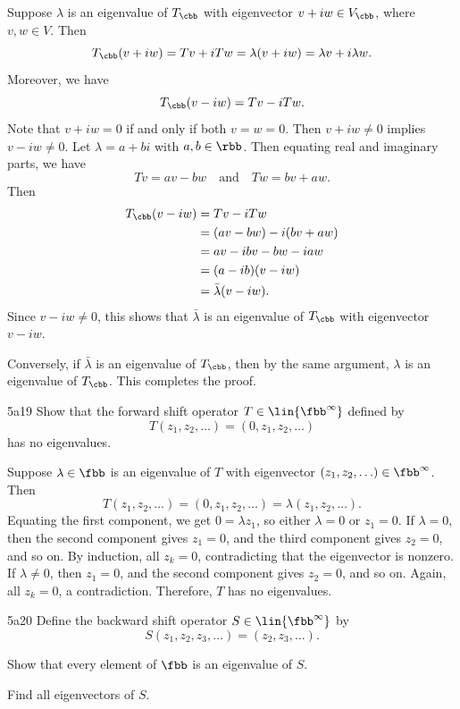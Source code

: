 \begin{sol}
    Suppose $\lambda$ is an eigenvalue of $T_\cbb$ with eigenvector $v + iw \in V_\cbb$, where $v, w \in V$.
	Then
    \[
    	T_\cbb(v + iw) = Tv + iTw = \lambda (v + iw) = \lambda v + i\lambda w.
    \]
    Moreover, we have
    \[
    	T_\cbb(v - iw) = Tv - iTw.
    \]
    Note that $v + iw = 0$ if and only if both $v = w = 0$.
	Then $v + iw \neq 0$ implies $v -i w \neq 0$.
	Let $\lambda = a + bi$ with $a, b \in \rbb$.
	Then equating real and imaginary parts, we have
    \[
    	Tv = av - bw \quad \text{and} \quad Tw = bv + aw.
    \]
    Then
    \begin{align*}
        T_\cbb(v - iw) &= Tv - iTw \\
        &= (av - bw) - i(bv + aw) \\
        &= av - ibv - bw - iaw \\
        &= (a - ib)(v - iw) \\
        &= \bar{\lambda} (v - iw).
    \end{align*}
    Since $v - iw \neq 0$, this shows that $\bar{\lambda}$ is an eigenvalue of $T_\cbb$ with eigenvector $v - iw$.

    Conversely, if $\bar{\lambda}$ is an eigenvalue of $T_\cbb$, then by the same argument, $\lambda$ is an eigenvalue of $T_\cbb$.
	This completes the proof.
\end{sol}

\begin{exercise}{5a19}
    Show that the forward shift operator $T \in \lin{\fbb^\infty}$ defined by
    \[
    	T(z_1, z_2, \ldots) = (0, z_1, z_2, \ldots)
    \]
    has no eigenvalues.
\end{exercise}

\begin{sol}
    Suppose $\lambda \in \fbb$ is an eigenvalue of $T$ with eigenvector $(z_1, z_2, \ldots) \in \fbb^\infty$.
	Then
    \[
    	T(z_1, z_2, \ldots) = (0, z_1, z_2, \ldots) = \lambda (z_1, z_2, \ldots).
    \]
    Equating the first component, we get $0 = \lambda z_1$, so either $\lambda = 0$ or $z_1 = 0$.
	If $\lambda = 0$, then the second component gives $z_1 = 0$, and the third component gives $z_2 = 0$, and so on.
	By induction, all $z_k = 0$, contradicting that the eigenvector is nonzero.
	If $\lambda \neq 0$, then $z_1 = 0$, and the second component gives $z_2 = 0$, and so on.
	Again, all $z_k = 0$, a contradiction.
	Therefore, $T$ has no eigenvalues.
\end{sol}

\begin{exercise}{5a20}
    Define the backward shift operator $S \in \lin{\fbb^\infty}$ by
    \[
    	S(z_1, z_2, z_3, \ldots) = (z_2, z_3, \ldots).
    \]
    \begin{subexercises}
        \item Show that every element of $\fbb$ is an eigenvalue of $S$.
        \item Find all eigenvectors of $S$.
    \end{subexercises}
\end{exercise}

